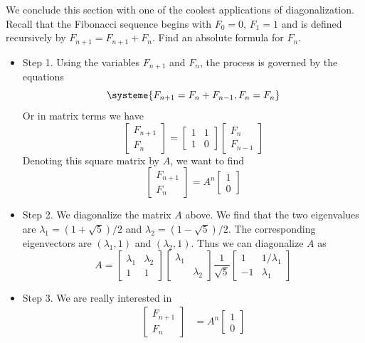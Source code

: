 \documentclass[11pt,oneside]{amsbook}
\theoremstyle{definition}
\theoremstyle{plain}
\theoremstyle{definition}
\theoremstyle{remark}
\numberwithin{equation}{section}
\numberwithin{figure}{section}
\begin{document}
We conclude this section with one of the coolest applications of diagonalization. Recall that the Fibonacci sequence begins with $F_0=0$, $F_1=1$ and is defined recursively by $F_{n+1}=F_{n+1}+F_n$. Find an absolute formula for $F_n$.
\begin{itemize}
  \item Step 1. Using the variables $F_{n+1}$ and $F_n$, the process is governed by the equations
  \[\systeme{F_{n+1}=F_n+F_{n-1},F_n=F_n}
  \]
  Or in matrix terms we have
  \[\begin{bmatrix}F_{n+1}\\F_n\end{bmatrix}
    =\begin{bmatrix}1&1\\1&0\end{bmatrix}
    \begin{bmatrix}F_n\\F_{n-1}\end{bmatrix}
  \]
  Denoting this square matrix by $A$, we want to find
  \[\begin{bmatrix}F_{n+1}\\F_n\end{bmatrix}
    =A^n\begin{bmatrix}1\\0\end{bmatrix}
  \]
  \item Step 2. We diagonalize the matrix $A$ above. We find that the two eigenvalues are $\lambda_1=(1+\sqrt{5})/2$ and $\lambda_2=(1-\sqrt{5})/2$. The corresponding eigenvectors are $(\lambda_1,1)$ and $(\lambda_2,1)$. Thus we can diagonalize $A$ as
  \[A=\begin{bmatrix}\lambda_1&\lambda_2\\1&1\end{bmatrix}
    \begin{bmatrix}\lambda_1\\&\lambda_2\end{bmatrix}
    \frac{1}{\sqrt{5}}
    \begin{bmatrix}1&1/\lambda_1\\-1&\lambda_1\end{bmatrix}
    \]
  \item Step 3. We are really interested in
  \begin{align*}
    \begin{bmatrix}F_{n+1}\\F_n\end{bmatrix}
    &=A^n\begin{bmatrix}1\\0\end{bmatrix}\\

\end{align*}
\end{itemize}
\end{document}

